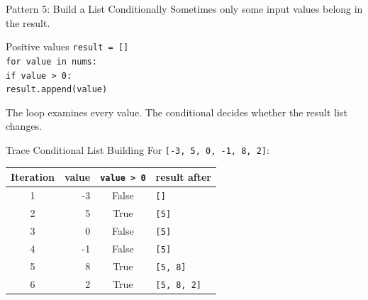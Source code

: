 \documentclass[aspectratio=169,10pt]{beamer}
\begin{document}

\begin{frame}{Pattern 5: Build a List Conditionally}
  Sometimes only some input values belong in the result.

  \begin{block}{Positive values}
    \texttt{result = []}\\
    \texttt{for value in nums:}\\
    \hspace{0.20in}\texttt{if value > 0:}\\
    \hspace{0.40in}\texttt{result.append(value)}
  \end{block}

  The loop examines every value. The conditional decides whether the result list changes.
\end{frame}

\begin{frame}{Trace Conditional List Building}
  For \texttt{[-3, 5, 0, -1, 8, 2]}:

  \begin{center}
    \renewcommand{\arraystretch}{1.16}
    \begin{tabular}{c|r|c|l}
      \textbf{Iteration} & \textbf{value} & \textbf{\texttt{value > 0}} & \textbf{result after} \\\hline
      1 & -3 & False & \texttt{[]} \\
      2 & 5 & True & \texttt{[5]} \\
      3 & 0 & False & \texttt{[5]} \\
      4 & -1 & False & \texttt{[5]} \\
      5 & 8 & True & \texttt{[5, 8]} \\
      6 & 2 & True & \texttt{[5, 8, 2]}
    \end{tabular}
  \end{center}
\end{frame}
\end{document}
